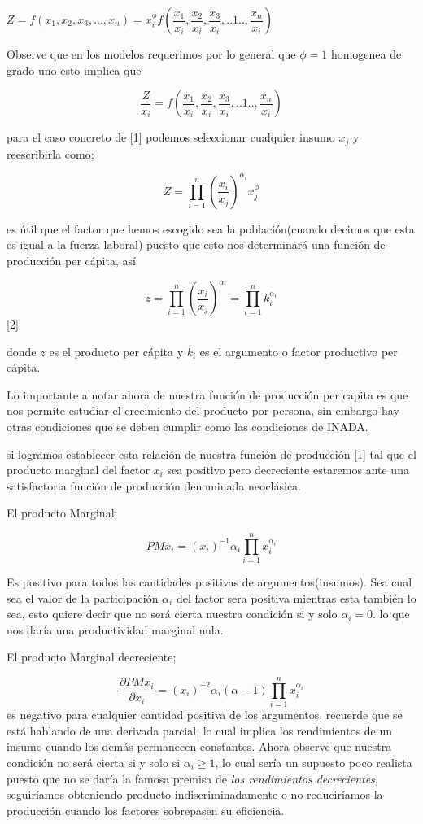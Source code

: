 \documentclass[12pt,a4paper,  titlepage]{article}
\begin{document}
$Z = f(x_1,x_2,x_3,...,x_n) =  x_i^\phi f( \dfrac{x_1}{x_i},\dfrac{x_2}{x_i},\dfrac{x_3}{x_i},..1..,\dfrac{x_n}{x_i})$

Observe que en los modelos requerimos por lo general que $\phi=1$ homogenea de grado uno esto implica que 

$$
\dfrac{Z}{x_i}=f( \dfrac{x_1}{x_i},\dfrac{x_2}{x_i},\dfrac{x_3}{x_i},..1..,\dfrac{x_n}{x_i})$$

para el caso concreto de [1] podemos seleccionar cualquier insumo $x_j$ y reescribirla como; 


$$Z=\prod_{i=1}^n \left( \frac{x_i}{x_j}\right)^{\alpha_i} x_j^{\phi}$$


es útil que el factor que hemos escogido sea la población(cuando decimos que esta es igual a la fuerza laboral) puesto que esto nos determinará una función de producción per cápita, así


 $$z=\prod_{i=1}^n \left( \frac{x_i}{x_j}\right)^{\alpha_i}  =\prod_{i=1}^n k_{i}^{\alpha_i}$$  [2]

donde $z$ es el producto per cápita y $k_{i}$ es el argumento o factor productivo per cápita.

Lo importante a notar ahora de nuestra función de producción per capita es que nos permite estudiar el crecimiento del producto por persona, sin embargo hay otras condiciones que se deben cumplir como las condiciones de INADA.

si logramos establecer esta relación de nuestra función de producción [1] tal que el producto marginal del factor $x_{i}$ sea positivo pero decreciente estaremos ante una satisfactoria función de producción denominada neoclásica.


El producto Marginal; 

$$PMx_i=(x_i)^{-1}\alpha_i\prod_{i=1}^nx_i^{\alpha_i}$$

Es positivo para todos las cantidades positivas de argumentos(insumos). Sea cual sea el valor de la participación $\alpha_i$ del factor sera positiva mientras esta también lo sea, esto quiere decir que no será cierta nuestra condición si y solo $\alpha_{i}=0$. lo que nos daría una productividad marginal nula.


El producto Marginal decreciente;

$$\frac{\partial PMx_i}{\partial x_i}=(x_i)^{-2}\alpha_i(\alpha - 1)\prod_{i=1}^nx_i^{\alpha_i}$$
es negativo para cualquier cantidad positiva de los argumentos, recuerde que se está hablando de una derivada parcial, lo cual implica los rendimientos de un insumo cuando los demás permanecen constantes. Ahora observe que nuestra condición no será cierta si y solo si $\alpha_i \geq 1$, lo cual sería un supuesto poco realista puesto que no se daría la famosa premisa de \textit{los rendimientos decrecientes}, seguiríamos obteniendo producto indiscriminadamente o no reduciríamos la producción cuando los factores sobrepasen su eficiencia.
\end{document}
